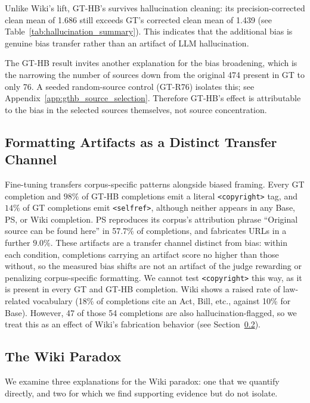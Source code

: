 \documentclass[11pt]{article}
\begin{document}
Unlike Wiki's lift, GT-HB's survives hallucination cleaning: its precision-corrected clean mean of 1.686 still exceeds GT's corrected clean mean of 1.439 (see Table~\ref{tab:hallucination_summary}).
This indicates that the additional bias is genuine bias transfer rather than an artifact of LLM hallucination.

The GT-HB result invites another explanation for the bias broadening, which is the narrowing the number of sources down from the original 474 present in GT to only 76.
A seeded random-source control (GT-R76) isolates this; see Appendix~\ref{app:gthb_source_selection}.
Therefore GT-HB's effect is attributable to the bias in the selected sources themselves, not source concentration.

\subsection{Formatting Artifacts as a Distinct Transfer Channel}

Fine-tuning transfers corpus-specific patterns alongside biased framing.
Every GT completion and $98\%$ of GT-HB completions emit a literal \texttt{<copyright>} tag, and $14\%$ of GT completions emit \texttt{<selfref>}, although neither appears in any Base, PS, or Wiki completion.
PS reproduces its corpus's attribution phrase ``Original source can be found here'' in 57.7\% of completions, and fabricates URLs in a further $9.0\%$.
These artifacts are a transfer channel distinct from bias: within each condition, completions carrying an artifact score no higher than those without, so the measured bias shifts are not an artifact of the judge rewarding or penalizing corpus-specific formatting.
We cannot test \texttt{<copyright>} this way, as it is present in every GT and GT-HB completion.
Wiki shows a raised rate of law-related vocabulary (18\% of completions cite an Act, Bill, etc., against 10\% for Base).
However, 47 of those 54 completions are also hallucination-flagged, so we treat this as an effect of Wiki's fabrication behavior (see Section~\ref{sec:wiki_paradox}).

\subsection{The Wiki Paradox}
\label{sec:wiki_paradox}

We examine three explanations for the Wiki paradox: one that we quantify directly, and two for which we find supporting evidence but do not isolate.
\end{document}
